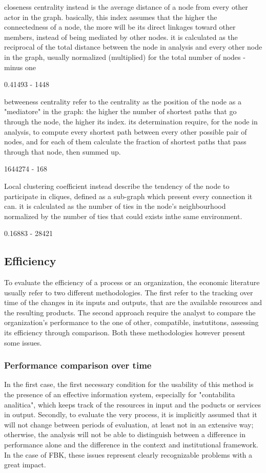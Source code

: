 closeness centrality instead is the average distance of a node from every other actor in the graph. basically, this index assumes that the higher the connectedness of a node, the more will be its direct linkages toward other members, instead of being mediated by other nodes. it is calculated as the reciprocal of the total distance between the node in analysis and every other node in the graph, usually normalized (multiplied) for the total number of nodes -minus one 

0.41493 - 1448 

betweeness centrality refer to the centrality as the position of the node as a "mediatore" in the graph: the higher the number of shortest paths that go through the node, the higher its index. its determination require, for the node in analysis, to compute every shortest path between every other possible pair of nodes, and for each of them calculate the fraction of shortest paths that pass through that node, then summed up.  

1644274 - 168

Local clustering coefficient instead describe the tendency of the node to participate in cliques, defined as a sub-graph which present every connection it can. it is calculated as the number of ties in the node's neighbourhood normalized by the number of ties that could exists inthe same environment. 

0.16883 - 28421 

\subsection{Efficiency}

To evaluate the efficiency of a process or an organization, the economic literature usually refer to two different methodologies. The first refer to the tracking over time of the changes in its inputs and outputs, that are the available resources and the resulting products. The second approach require the analyst to compare the organization's performance to the one of other, compatible, instutitons, assessing its efficiency through comparison. Both these methodologies however present some issues.

\subsubsection{Performance comparison over time}

In the first case, the first necessary condition for the usability of this method is the presence of an effective information system, especially for "contabilita analitica", which keeps track of the resources in input and the poducts or services in output. Secondly, to evaluate the very process, it is implicitly assumed that it will not change between periods of evaluation, at least not in an extensive way; otherwise, the analysis will not be able to distinguish between a difference in performance alone and the difference in the context and institutional framework. In the case of FBK, these issues represent clearly recognizable problems with a great impact. 

